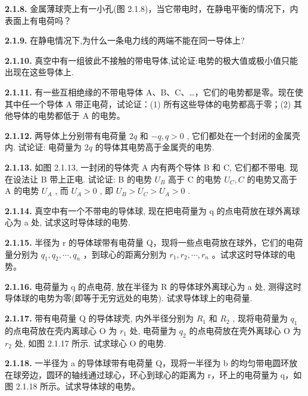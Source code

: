 \vfill
\newpage

\textbf{2.1.8.} 金属薄球壳上有一小孔(图 2.1.8)，当它带电时，在静电平衡的情况下，内表面上有电荷吗？

\vfill
\newpage

\textbf{2.1.9.} 在静电情况下,为什么一条电力线的两端不能在同一导体上?

\vfill
\newpage

\textbf{2.1.10.} 真空中有一组彼此不接触的带电导体,试论证:电势的极大值或极小值只能出现在这些导体上.

\vfill
\newpage

\textbf{2.1.11.} 有一些互相绝缘的不带电导体 A、B、C、…，它们的电势都是零。现在使其中任一个导体 A 带正电荷，试论证：(1) 所有这些导体的电势都高于零；(2) 其他导体的电势都低于 A 的电势。

\vfill
\newpage

\textbf{2.1.12.} 两导体上分别带有电荷量 $2q$ 和 $-q, q > 0$ , 它们都处在一个封闭的金属壳内. 试论证: 电荷量为 $2q$ 的导体其电势高于金属壳的电势.

\vfill
\newpage

\textbf{2.1.13.} 如图 2.1.13, 一封闭的导体壳 A 内有两个导体 B 和 C, 它们都不带电. 现在设法让 B 带上正电. 试论证: B 的电势 $U_{B}$ 高于 C 的电势 $U_{C}, C$ 的电势又高于 A 的电势 $U_{A}$ , 而 $U_{A} > 0$ , 即 $U_{B} > U_{C} > U_{A} > 0$ .

\vfill
\newpage

\textbf{2.1.14.} 真空中有一个不带电的导体球, 现在把电荷量为 q 的点电荷放在球外离球心为 a 处, 试求这时导体球的电势.

\vfill
\newpage

\textbf{2.1.15.} 半径为 r 的导体球带有电荷量 Q，现将一些点电荷放在球外，它们的电荷量分别为 $q_{1}, q_{2}, \cdots, q_{n}$ ，到球心的距离分别为 $r_{1}, r_{2}, \cdots, r_{n}$ 。试求这时导体球的电势。

\vfill
\newpage

\textbf{2.1.16.} 电荷量为 q 的点电荷, 放在半径为 R 的导体球外离球心为 a 处, 测得这时导体球的电势为零(即等于无穷远处的电势). 试求导体球上的电荷量.

\vfill
\newpage

\textbf{2.1.17.} 带有电荷量 Q 的导体球壳, 内外半径分别为 $R_{1}$ 和 $R_{2}$ , 现将电荷量为 $q_{1}$ 的点电荷放在壳内离球心 O 为 $r_{1}$ 处, 电荷量为 $q_{2}$ 的点电荷放在壳外离球心 O 为 $r_{2}$ 处, 如图 2.1.17 所示. 试求球心 O 的电势.

\vfill
\newpage

\textbf{2.1.18.} 一半径为 a 的导体球带有电荷量 Q，现将一半径为 b 的均匀带电圆环放在球旁边，圆环的轴线通过球心，环心到球心的距离为 r，环上的电荷量为 q，如图 2.1.18 所示。试求导体球的电势。

